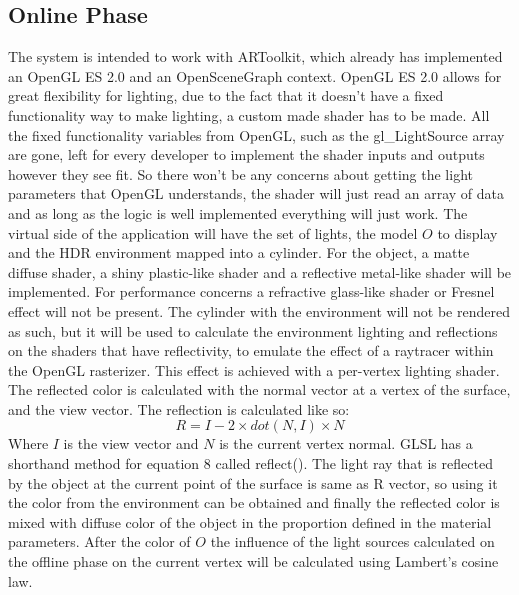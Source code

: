\subsection{Online Phase}
The system is intended to work with ARToolkit, which already has implemented an OpenGL ES 2.0 and an OpenSceneGraph context. OpenGL ES 2.0 allows for great flexibility for lighting, due to the fact that it doesn't have a fixed functionality way to make lighting, a custom made shader has to be made. All the fixed functionality variables from OpenGL, such as the gl\_LightSource array are gone, left for every developer to implement the shader inputs and outputs however they see fit. So there won't be any concerns about getting the light parameters that OpenGL understands, the shader will just read an array of data and as long as the logic is well implemented everything will just work.\newline
The virtual side of the application will have the set of lights, the model $O$ to display and the HDR environment mapped into a cylinder. For the object, a matte diffuse shader, a shiny plastic-like shader and a reflective metal-like shader will be implemented. For performance concerns a refractive glass-like shader or Fresnel effect will not be present. The cylinder with the environment will not be rendered as such, but it will be used to calculate the environment lighting and reflections on the shaders that have reflectivity, to emulate the effect of a raytracer within the OpenGL rasterizer. This effect is achieved with a per-vertex lighting shader.  The reflected color is calculated with the normal vector at a vertex of the surface, and the view vector. The reflection is calculated like so:
\begin{equation}
    R = I - 2\times dot(N,I) \times N
\end{equation}
Where $I$ is the view vector and $N$ is the current vertex normal. GLSL has a shorthand method for equation 8 called reflect().
The light ray that is reflected by the object at the current point of the surface is same as R vector, so using it the color from the environment can be obtained and finally the reflected color is mixed with diffuse color of the object in the proportion defined in the material parameters. \newline
After the color of $O$ the influence of the light sources calculated on the offline phase on the current vertex will be calculated using Lambert's cosine law.